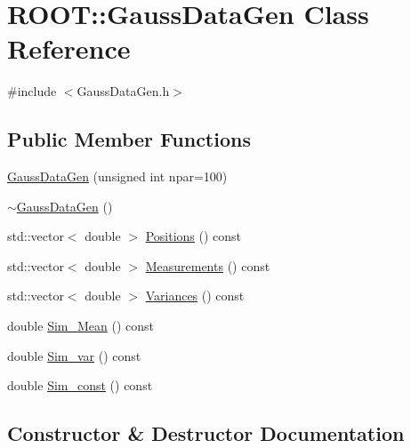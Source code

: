 \hypertarget{classROOT_1_1Minuit2_1_1GaussDataGen}{}\section{R\+O\+OT\+:\+:Gauss\+Data\+Gen Class Reference}
\label{classROOT_1_1Minuit2_1_1GaussDataGen}


{\ttfamily \#include $<$Gauss\+Data\+Gen.\+h$>$}

\subsection*{Public Member Functions}
\begin{DoxyCompactItemize}
\item 
\mbox{\hyperlink{classROOT_1_1Minuit2_1_1GaussDataGen_a9d4852a18f8d4f261ea60f5b2abeee4d}{Gauss\+Data\+Gen}} (unsigned int npar=100)
\item 
\mbox{\hyperlink{classROOT_1_1Minuit2_1_1GaussDataGen_ab35aa0205949603dbe8731c6d47e79f0}{$\sim$\+Gauss\+Data\+Gen}} ()
\item 
std\+::vector$<$ double $>$ \mbox{\hyperlink{classROOT_1_1Minuit2_1_1GaussDataGen_a1f8db2c19b438ac1665045a5737c1d62}{Positions}} () const
\item 
std\+::vector$<$ double $>$ \mbox{\hyperlink{classROOT_1_1Minuit2_1_1GaussDataGen_aa943fffb99444ab2b72198f36b906f71}{Measurements}} () const
\item 
std\+::vector$<$ double $>$ \mbox{\hyperlink{classROOT_1_1Minuit2_1_1GaussDataGen_ab2f22917ba4f242a2888c908a8629260}{Variances}} () const
\item 
double \mbox{\hyperlink{classROOT_1_1Minuit2_1_1GaussDataGen_a97c0d9f3e7d706d93a06f8bad82e137a}{Sim\+\_\+\+Mean}} () const
\item 
double \mbox{\hyperlink{classROOT_1_1Minuit2_1_1GaussDataGen_ab46d49eb0cd02fcf7e5799258133c91b}{Sim\+\_\+var}} () const
\item 
double \mbox{\hyperlink{classROOT_1_1Minuit2_1_1GaussDataGen_afa45bb0270f15866b588da8d8f56cfba}{Sim\+\_\+const}} () const
\end{DoxyCompactItemize}


\subsection{Constructor \& Destructor Documentation}
\mbox{\label{classROOT_1_1Minuit2_1_1GaussDataGen_a9d4852a18f8d4f261ea60f5b2abeee4d}} 
